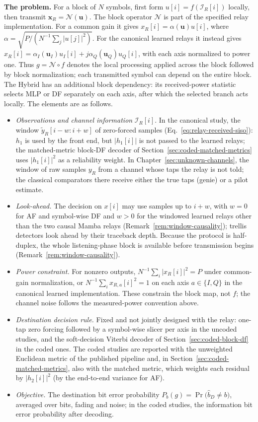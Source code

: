 \textbf{The problem.} For a block of $N$ symbols, first form $u[i]=f(\mathcal I_R[i])$ locally, then transmit $\mathbf x_R=\mathcal N(\mathbf u)$. The block operator $\mathcal N$ is part of the specified relay implementation. For a common gain it gives $x_R[i]=\alpha(\mathbf u)u[i]$, where $\alpha=\sqrt{P/(N^{-1}\sum_j|u[j]|^2)}$. For the canonical learned relays it instead gives $x_R[i]=\alpha_I(\mathbf u_I)u_I[i]+j\alpha_Q(\mathbf u_Q)u_Q[i]$, with each axis normalized to power one. Thus $g=\mathcal N\circ f$ denotes the local processing applied across the block followed by block normalization; each transmitted symbol can depend on the entire block. The Hybrid has an additional block dependency: its received-power statistic selects MLP or DF separately on each axis, after which the selected branch acts locally. The elements are as follows.
\begin{itemize}
\tightlist
\item \emph{Observations and channel information} $\mathcal{I}_R[i]$. In the canonical study, the window $\tilde{y}_R[i-w{:}i+w]$ of zero-forced samples (Eq.~\eqref{eq:relay-received-siso}): $h_1$ is used by the front end, but $|h_1[i]|$ is not passed to the learned relays; the matched-metric block-DF decoder of Section~\ref{sec:coded-matched-metrics} uses $|h_1[i]|^{2}$ as a reliability weight. In Chapter~\ref{sec:unknown-channels}, the window of raw samples $y_R$ from a channel whose taps the relay is not told; the classical comparators there receive either the true taps (genie) or a pilot estimate.
\item \emph{Look-ahead.} The decision on $x[i]$ may use samples up to $i+w$, with $w=0$ for AF and symbol-wise DF and $w>0$ for the windowed learned relays other than the two causal Mamba relays (Remark~\ref{rem:window-causality}); trellis detectors look ahead by their traceback depth. Because the protocol is half-duplex, the whole listening-phase block is available before transmission begins (Remark~\ref{rem:window-causality}).
\item \emph{Power constraint.} For nonzero outputs, $N^{-1}\sum_i|x_R[i]|^2=P$ under common-gain normalization, or $N^{-1}\sum_i x_{R,a}[i]^2=1$ on each axis $a\in\{I,Q\}$ in the canonical learned implementation. These constrain the block map, not $f$; the channel noise follows the measured-power convention above.
\item \emph{Destination decision rule.} Fixed and not jointly designed with the relay: one-tap zero forcing followed by a symbol-wise slicer per axis in the uncoded studies, and the soft-decision Viterbi decoder of Section~\ref{sec:coded-block-df} in the coded ones. The coded studies are reported with the unweighted Euclidean metric of the published pipeline and, in Section~\ref{sec:coded-matched-metrics}, also with the matched metric, which weights each residual by $|h_2[i]|^{2}$ (by the end-to-end variance for AF).
\item \emph{Objective.} The destination bit error probability $P_b(g) = \Pr\bigl(\hat{b}_D \neq b\bigr)$, averaged over bits, fading and noise; in the coded studies, the information bit error probability after decoding.
\end{itemize}
